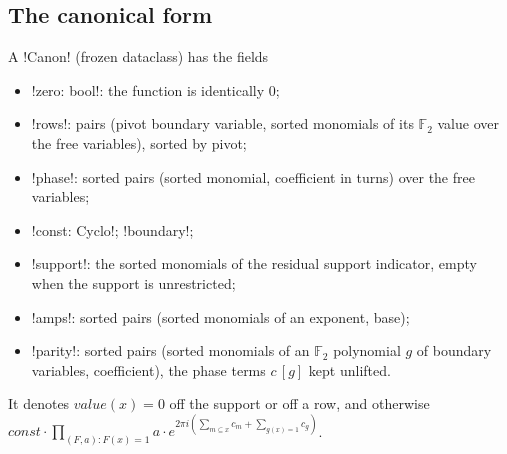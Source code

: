 \subsection{The canonical form}

\begin{definition}\label{def:algebra-canon}
A \py!Canon! (frozen dataclass) has the fields
\begin{itemize}
\item \py!zero: bool!: the function is identically $0$;
\item \py!rows!: pairs (pivot boundary variable, sorted monomials of its $\mathbb{F}_2$ value over the free variables), sorted by pivot;
\item \py!phase!: sorted pairs (sorted monomial, coefficient in turns) over the free variables;
\item \py!const: Cyclo!; \py!boundary!;
\item \py!support!: the sorted monomials of the residual support indicator, empty when the support is unrestricted;
\item \py!amps!: sorted pairs (sorted monomials of an exponent, base);
\item \py!parity!: sorted pairs (sorted monomials of an $\mathbb{F}_2$ polynomial $g$ of boundary variables, coefficient), the phase terms $c\,[g]$ kept unlifted.
\end{itemize}
It denotes $\mathit{value}(x)=0$ off the support or off a row, and otherwise $\mathit{const}\cdot\prod_{(F,a):F(x)=1}a\cdot e^{2\pi i(\sum_{m\subseteq x}c_m+\sum_{g(x)=1}c_g)}$.
\end{definition}

